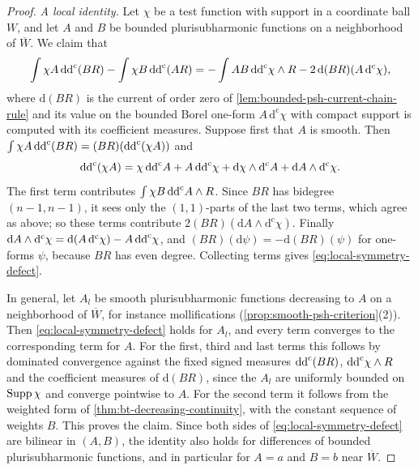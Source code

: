 \begin{proof}
\emph{A local identity.} Let $\chi$ be a test function with support in a coordinate ball $W$, and let $A$ and $B$ be bounded plurisubharmonic functions on a neighborhood of $\overline W$. We claim that
\begin{equation}\label{eq:local-symmetry-defect}
 \int\chi A\,\mathrm{dd}^{\mathrm{c}}(BR)-\int\chi B\,\mathrm{dd}^{\mathrm{c}}(AR)=-\int AB\,\mathrm{dd}^{\mathrm{c}}\chi\wedge R-2\,\mathrm d(BR)(A\,\mathrm d^{\mathrm c}\chi),
\end{equation}
where $\mathrm d(BR)$ is the current of order zero of \cref{lem:bounded-psh-current-chain-rule} and its value on the bounded Borel one-form $A\,\mathrm d^{\mathrm c}\chi$ with compact support is computed with its coefficient measures. Suppose first that $A$ is smooth. Then $\int\chi A\,\mathrm{dd}^{\mathrm{c}}(BR)=(BR)(\mathrm{dd}^{\mathrm{c}}(\chi A))$ and
\[
 \mathrm{dd}^{\mathrm{c}}(\chi A)=\chi\,\mathrm{dd}^{\mathrm{c}} A+A\,\mathrm{dd}^{\mathrm{c}}\chi+\mathrm d\chi\wedge\mathrm d^{\mathrm c}A+\mathrm dA\wedge\mathrm d^{\mathrm c}\chi.
\]
The first term contributes $\int\chi B\,\mathrm{dd}^{\mathrm{c}} A\wedge R$. Since $BR$ has bidegree $(n-1,n-1)$, it sees only the $(1,1)$-parts of the last two terms, which agree as above; so these terms contribute $2(BR)(\mathrm dA\wedge\mathrm d^{\mathrm c}\chi)$. Finally $\mathrm dA\wedge\mathrm d^{\mathrm c}\chi=\mathrm d(A\,\mathrm d^{\mathrm c}\chi)-A\,\mathrm{dd}^{\mathrm{c}}\chi$, and $(BR)(\mathrm d\psi)=-\mathrm d(BR)(\psi)$ for one-forms $\psi$, because $BR$ has even degree. Collecting terms gives \eqref{eq:local-symmetry-defect}.

In general, let $A_l$ be smooth plurisubharmonic functions decreasing to $A$ on a neighborhood of $\overline W$, for instance mollifications (\cref{prop:smooth-psh-criterion}(2)). Then \eqref{eq:local-symmetry-defect} holds for $A_l$, and every term converges to the corresponding term for $A$. For the first, third and last terms this follows by dominated convergence against the fixed signed measures $\mathrm{dd}^{\mathrm{c}}(BR)$, $\mathrm{dd}^{\mathrm{c}}\chi\wedge R$ and the coefficient measures of $\mathrm d(BR)$, since the $A_l$ are uniformly bounded on $\operatorname{Supp}\chi$ and converge pointwise to $A$. For the second term it follows from the weighted form of \cref{thm:bt-decreasing-continuity}, with the constant sequence of weights $B$. This proves the claim. Since both sides of \eqref{eq:local-symmetry-defect} are bilinear in $(A,B)$, the identity also holds for differences of bounded plurisubharmonic functions, and in particular for $A=a$ and $B=b$ near $\overline W$.


\end{proof}
